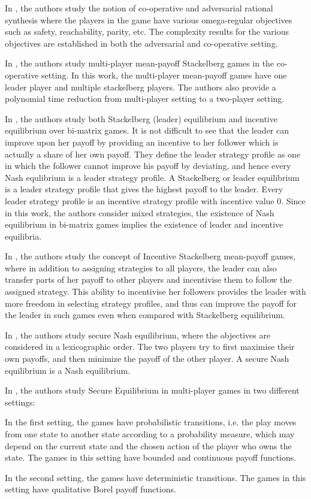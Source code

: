 In \cite{CFGR16}, the authors study the notion of co-operative and adversarial rational synthesis where the players in the game have various omega-regular objectives such as safety, reachability, parity, etc. The complexity results for the various objectives are established in both the adversarial and co-operative setting. 

In \cite{GS14}, the authors study multi-player mean-payoff Stackelberg games in the co-operative setting. In this work, the multi-player mean-payoff games have one leader player and multiple stackelberg players. The authors also provide a polynomial time reduction from multi-player setting to a two-player setting.

In \cite{GS18}, the authors study both Stackelberg (leader) equilibrium and incentive equilibrium over bi-matrix games. It is not difficult to see that the leader can improve upon her payoff by providing an incentive to her follower which is actually a share of her own payoff. They define the leader strategy profile as one in which the follower cannot improve his payoff by deviating, and hence every Nash equlibrium is a leader strategy profile. A Stackelberg or leader equilibrium is a leader strategy profile that gives the highest payoff to the leader. Every leader strategy profile is an incentive strategy profile with incentive value $0$. Since in this work, the authors consider mixed strategies, the existence of Nash equilibrium in bi-matrix games \cite{Nash50,LH64} implies the existence of leader and incentive equilibria.

In \cite{GSTDP16}, the authors study the concept of Incentive Stackelberg mean-payoff games, where in addition to assigning strategies to all players, the leader can also transfer parts of her payoff to other players and incentivise them to follow the assigned strategy. This ability to incentivise her followers provides the leader with more freedom in selecting strategy profiles, and thus can improve the payoff for the leader in such games even when compared with Stackelberg equilibrium.

In \cite{CHJ06}, the authors study secure Nash equilibrium, where the objectives are considered in a lexicographic order. The two players try to first maximise their own payoffs, and then minimize the payoff of the other player. A secure Nash equilibrium is a Nash equilibrium. 

In \cite{PFKSV14}, the authors study Secure Equilibrium in multi-player games in two different settings: 
\begin{inparaenum}[(i)]
    \item In the first setting, the games have probabilistic transitions, i.e. the play moves from one state to another state according to a probability measure, which may depend on the current state and the chosen action of the player who owns the state. The games in this setting have bounded and continuous payoff functions.
    \item In the second setting, the games have deterministic transitions. The games in this setting have qualitative Borel payoff functions.
\end{inparaenum}

